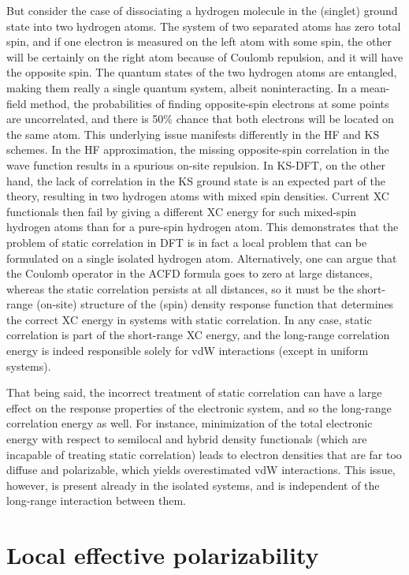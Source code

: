 But consider the case of dissociating a hydrogen molecule in the (singlet) ground state into two hydrogen atoms.
The system of two separated atoms has zero total spin, and if one electron is measured on the left atom with some spin, the other will be certainly on the right atom because of Coulomb repulsion, and it will have the opposite spin.
The quantum states of the two hydrogen atoms are entangled, making them really a single quantum system, albeit noninteracting.
In a mean-field method, the probabilities of finding opposite-spin electrons at some points are uncorrelated, and there is 50\% chance that both electrons will be located on the same atom.
This underlying issue manifests differently in the HF and KS schemes.
In the HF approximation, the missing opposite-spin correlation in the wave function results in a spurious on-site repulsion.
In KS-DFT, on the other hand, the lack of correlation in the KS ground state is an expected part of the theory, resulting in two hydrogen atoms with mixed spin densities.
Current XC functionals then fail by giving a different XC energy for such mixed-spin hydrogen atoms than for a pure-spin hydrogen atom.
This demonstrates that the problem of static correlation in DFT is in fact a local problem that can be formulated on a single isolated hydrogen atom.
Alternatively, one can argue that the Coulomb operator in the ACFD formula goes to zero at large distances, whereas the static correlation persists at all distances, so it must be the short-range (on-site) structure of the (spin) density response function that determines the correct XC energy in systems with static correlation.
In any case, static correlation is part of the short-range XC energy, and the long-range correlation energy is indeed responsible solely for vdW interactions (except in uniform systems).

That being said, the incorrect treatment of static correlation can have a large effect on the response properties of the electronic system, and so the long-range correlation energy as well.
For instance, minimization of the total electronic energy with respect to semilocal and hybrid density functionals (which are incapable of treating static correlation) leads to electron densities that are far too diffuse and polarizable, which yields overestimated vdW interactions.
This issue, however, is present already in the isolated systems, and is independent of the long-range interaction between them.

\section{Local effective polarizability}\label{sec:local-pol}

